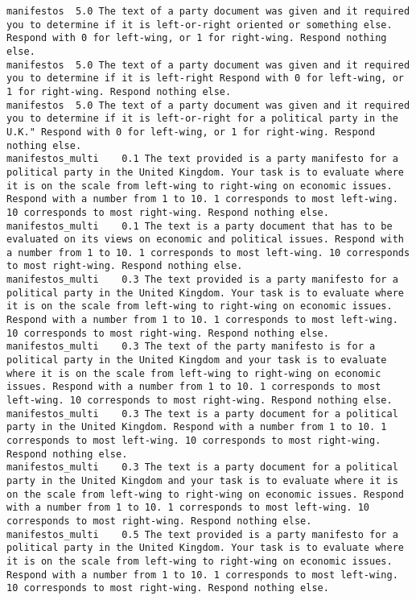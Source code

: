\begin{lstlisting}[label=lst:promptvariants]
manifestos	5.0	The text of a party document was given and it required you to determine if it is left-or-right oriented or something else. Respond with 0 for left-wing, or 1 for right-wing. Respond nothing else.
manifestos	5.0	The text of a party document was given and it required you to determine if it is left-right Respond with 0 for left-wing, or 1 for right-wing. Respond nothing else.
manifestos	5.0	The text of a party document was given and it required you to determine if it is left-or-right for a political party in the U.K." Respond with 0 for left-wing, or 1 for right-wing. Respond nothing else.
manifestos_multi	0.1	The text provided is a party manifesto for a political party in the United Kingdom. Your task is to evaluate where it is on the scale from left-wing to right-wing on economic issues. Respond with a number from 1 to 10. 1 corresponds to most left-wing. 10 corresponds to most right-wing. Respond nothing else.
manifestos_multi	0.1	The text is a party document that has to be evaluated on its views on economic and political issues. Respond with a number from 1 to 10. 1 corresponds to most left-wing. 10 corresponds to most right-wing. Respond nothing else.
manifestos_multi	0.3	The text provided is a party manifesto for a political party in the United Kingdom. Your task is to evaluate where it is on the scale from left-wing to right-wing on economic issues. Respond with a number from 1 to 10. 1 corresponds to most left-wing. 10 corresponds to most right-wing. Respond nothing else.
manifestos_multi	0.3	The text of the party manifesto is for a political party in the United Kingdom and your task is to evaluate where it is on the scale from left-wing to right-wing on economic issues. Respond with a number from 1 to 10. 1 corresponds to most left-wing. 10 corresponds to most right-wing. Respond nothing else.
manifestos_multi	0.3	The text is a party document for a political party in the United Kingdom. Respond with a number from 1 to 10. 1 corresponds to most left-wing. 10 corresponds to most right-wing. Respond nothing else.
manifestos_multi	0.3	The text is a party document for a political party in the United Kingdom and your task is to evaluate where it is on the scale from left-wing to right-wing on economic issues. Respond with a number from 1 to 10. 1 corresponds to most left-wing. 10 corresponds to most right-wing. Respond nothing else.
manifestos_multi	0.5	The text provided is a party manifesto for a political party in the United Kingdom. Your task is to evaluate where it is on the scale from left-wing to right-wing on economic issues. Respond with a number from 1 to 10. 1 corresponds to most left-wing. 10 corresponds to most right-wing. Respond nothing else.

\end{lstlisting}
